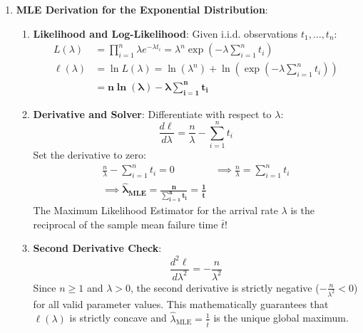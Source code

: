 \begin{enumerate}
    \item \textbf{MLE Derivation for the Exponential Distribution}:
    \begin{enumerate}[label=(\alph*)]
        \item \textbf{Likelihood and Log-Likelihood}:
        Given i.i.d. observations $t_1, \dots, t_n$:
        \begin{align*}
        L(\lambda) &= \prod_{i=1}^{n} \lambda e^{-\lambda t_i} = \lambda^n \exp\left( -\lambda \sum_{i=1}^{n} t_i \right) \\
        \ell(\lambda) &= \ln L(\lambda) = \ln(\lambda^n) + \ln\left( \exp\left( -\lambda \sum_{i=1}^{n} t_i \right) \right) \\
        &= \mathbf{n \ln(\lambda) - \lambda \sum_{i=1}^{n} t_i}
        \end{align*}
        \item \textbf{Derivative and Solver}:
        Differentiate with respect to $\lambda$:
        \begin{equation*}
        \frac{d\ell}{d\lambda} = \frac{n}{\lambda} - \sum_{i=1}^{n} t_i
        \end{equation*}
        Set the derivative to zero:
        \begin{align*}
        \frac{n}{\lambda} - \sum_{i=1}^{n} t_i = 0 &\implies \frac{n}{\lambda} = \sum_{i=1}^{n} t_i \\
        \implies \mathbf{\hat{\lambda}_{\text{MLE}} = \frac{n}{\sum_{i=1}^{n} t_i} = \frac{1}{\bar{t}}}
        \end{align*}
        The Maximum Likelihood Estimator for the arrival rate $\lambda$ is the reciprocal of the sample mean failure time $\bar{t}$!
        \item \textbf{Second Derivative Check}:
        \begin{equation*}
        \frac{d^2\ell}{d\lambda^2} = -\frac{n}{\lambda^2}
        \end{equation*}
        Since $n \ge 1$ and $\lambda > 0$, the second derivative is strictly negative ($-\frac{n}{\lambda^2} < 0$) for all valid parameter values. This mathematically guarantees that $\ell(\lambda)$ is strictly concave and $\hat{\lambda}_{\text{MLE}} = \frac{1}{\bar{t}}$ is the unique global maximum.
    \end{enumerate}
\end{enumerate}
